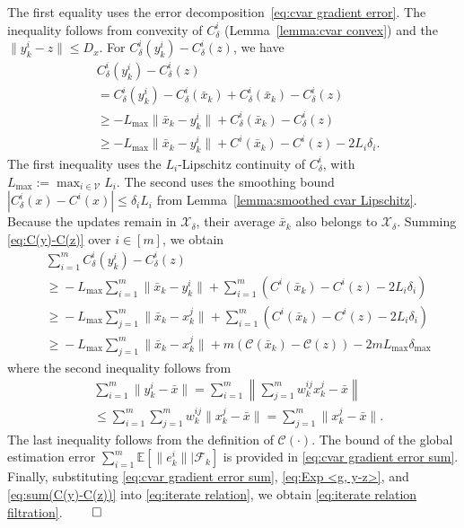 \documentclass[twocolumn]{autart}    %
\newcommand{\1}{\mathbf{1}}
\begin{document}
The first equality uses the error decomposition~\eqref{eq:cvar gradient error}. The inequality follows from convexity of $C_\delta^i$ (Lemma~\ref{lemma:cvar convex}) and the $\|y_k^i-z\|\le D_x$.
For $C_\delta^i (y_k^i) -C_\delta^i(z) $, we have 
\begin{align}\label{eq:C(y)-C(z)}
 &C_\delta^i(y_k^i) -C_\delta^i(z)  \nonumber \\
& =  C_\delta^i(y_k^i) - C_\delta^i(\bar{x}_k) + C_\delta^i(\bar{x}_k)-  C_\delta^i(z) \nonumber \\ 
& \ge -  L_{\max}\|\bar{x}_k-y_k^i\| + C_\delta^i(\bar{x}_k)-  C_\delta^i(z) \nonumber \\ 
& \ge - L_{\max}\|\bar{x}_k-y_k^i\| +  C^i(\bar{x}_k)-  C^i(z)  - 2L_i\delta_i.
\end{align}
The first inequality uses the $L_i$-Lipschitz continuity of $C_\delta^i$, with $L_{\max}:=\max_{i\in\mathcal V}L_i$. The second uses the smoothing bound $|C_\delta^i(x)-C^i(x)|\le\delta_iL_i$ from Lemma~\ref{lemma:smoothed cvar Lipschitz}. Because the updates remain in $\mathcal X_\delta$, their average $\bar x_k$ also belongs to $\mathcal X_\delta$.
Summing \eqref{eq:C(y)-C(z)} over $i \in [m]$, we obtain 
\begin{align}\label{eq:sum(C(y)-C(z))}
  &\sum_{i=1}^{m}  C_\delta^i(y_k^i)-C_\delta^i(z)  \nonumber \\ 
 & \! \geq \! -L_{\max}\sum_{i=1}^{m}\|\bar{x}_k-y_k^i\|+\sum_{i=1}^m\left(C^i(\bar{x}_k) -C^i(z)    -   2L_i\delta_i \right)  \nonumber \\
  & \!   \geq \! -L_{\max}\sum_{j=1}^{m}\|\bar{x}_k-x_k^j\| + \sum_{i=1}^m\left(C^i(\bar{x}_k) -C^i(z)    -   2L_i\delta_i \right)  \nonumber \\
 &  \! \geq\! -L_{\max}\sum_{j=1}^{m}\!\|\bar{x}_k-x_k^j\|\!+\!m(\mathcal{C}(\bar{x}_k)-\mathcal{C}(z))\!-\!    2mL_{\max}\delta_{\max}  
\end{align}
where the second inequality follows from
\begin{align*}
&\sum_{i=1}^{m}\|y_k^i- \bar{x}\| =\sum_{i=1}^{m}\left\|\sum_{j=1}^{m} w_k^{ij}  x_k^j- \bar{x}\right\|  \nonumber \\
&\leq \sum_{i=1}^{m} \sum_{j=1}^{m} w_k^{ij}\|x_k^j- \bar{x}\|  = \sum_{j=1}^{m}\|x_k^j- \bar{x}\| .
\end{align*} 
The last inequality follows from the definition of $\mathcal{C}(\cdot)$. 
The bound of the global estimation error $\sum_{i=1}^m\mathbb{E}\left[ \| e_k^i \| \big| \mathcal{F}_k\right] $ is provided in \eqref{eq:cvar gradient error sum}.
Finally, substituting \eqref{eq:cvar gradient error sum}, \eqref{eq:Exp <g, y-z>}, and \eqref{eq:sum(C(y)-C(z))} into \eqref{eq:iterate relation}, we obtain \eqref{eq:iterate relation filtration}.
\hfill $\qed$
 
\end{document}
